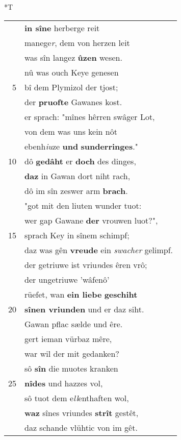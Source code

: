 \documentclass[8pt,a4paper,notitlepage]{article}
\begin{document}
\begin{table}[ht]
\hspace{0.5cm}
\begin{minipage}[t]{0.5\linewidth}
\small
\begin{center}*T
\end{center}
\begin{tabular}{rl}
 & \textbf{in sîne} herberge reit\\ 
 & manege\textit{r}, dem von herzen leit\\ 
 & was sîn langez \textbf{ûzen} wesen.\\ 
 & nû was ouch Keye genesen\\ 
5 & bî dem Plymizol der tjost;\\ 
 & der \textbf{pruofte} Gawanes kost.\\ 
 & er sprach: "mînes hêrren swâger Lot,\\ 
 & von dem was uns kein nôt\\ 
 & ebenh\textit{iu}ze \textbf{und} \textbf{sunderringes}."\\ 
10 & dô \textbf{gedâht} er \textbf{doch} des dinges,\\ 
 & \textbf{daz} in Gawan dort niht rach,\\ 
 & dô im sîn zeswer arm \textbf{brach}.\\ 
 & "got mit den liuten wunder tuot:\\ 
 & wer gap Gawane \textbf{der} vrouwen luot?",\\ 
15 & sprach Key in sînem schimpf;\\ 
 & daz was gên \textbf{vreude} ein \textit{swacher} gelimpf.\\ 
 & der getriuwe ist vriu\textit{n}des êren vrô;\\ 
 & der ungetriuwe 'wâfenô'\\ 
 & rüefet, wan \textbf{ein liebe} \textbf{geschiht}\\ 
20 & \textbf{sînen vriunden} und er daz siht.\\ 
 & Gawan pflac sælde und êre.\\ 
 & gert ieman vürbaz mêre,\\ 
 & war wil der mit gedanken?\\ 
 & sô \textbf{sîn} die muotes kranken\\ 
25 & \textbf{nîdes} und hazzes vol,\\ 
 & sô tuot dem e\textit{ll}enthaften wol,\\ 
 & \textbf{waz} sînes vriundes \textbf{strît} gestêt,\\ 
 & daz schande vlühtic von im gêt.\\ 

\end{tabular}
\end{minipage}
\end{table}
\end{document}
